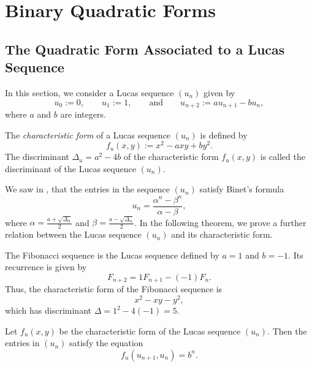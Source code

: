 \chapter{Binary Quadratic Forms}

\section{The Quadratic Form Associated to a Lucas Sequence}

In this section, we consider a Lucas sequence $(u_n)$ given by
\begin{equation*}
  u_0:=0,\qquad u_1:=1,\qquad\text{and}\qquad u_{n+2}:=a u_{n+1} -b u_n,
\end{equation*}
where $a$ and $b$ are integers.

\begin{definition}
  The \emph{characteristic form} of a Lucas sequence $(u_n)$ is defined by
  \begin{equation*}
    f_u(x,y):=x^2-axy+by^2.
  \end{equation*}
  The discriminant $\Delta_u=a^2-4b$ of the characteristic form $f_u(x,y)$ is called the discriminant of the Lucas sequence $(u_n)$.
\end{definition}

We saw in , that the entries in the sequence $(u_n)$ satisfy Binet's formula
\begin{equation*}
  u_n=\frac{\alpha^n-\beta^n}{\alpha-\beta},
\end{equation*}
where $\alpha=\frac{a+\sqrt{\Delta_u}}{2}$ and $\beta=\frac{a-\sqrt{\Delta_u}}{2}$. In the following theorem, we prove a further relation between the Lucas sequence $(u_n)$ and its characteristic form.

\begin{example}
  The Fibonacci sequence is the Lucas sequence defined by $a=1$ and $b=-1$. Its recurrence is given by
  \begin{equation*}
    F_{n+2} = 1 F_{n+1} - (-1)F_{n}.
  \end{equation*}
  Thus, the characteristic form of the Fibonacci sequence is
  \begin{equation*}
    x^2 - xy -y^2,
  \end{equation*}
  which has discriminant $\Delta=1^2 -4(-1)=5$.
\end{example}

\begin{theorem}
  Let $f_u(x,y)$ be the characteristic form of the Lucas sequence $(u_n)$. Then the entries in $(u_n)$ satisfy the equation
  \begin{equation*}
    f_u(u_{n+1},u_n)= b^n.
  \end{equation*}
\end{theorem}

